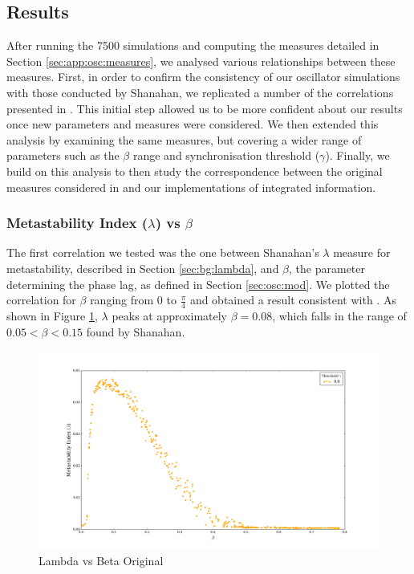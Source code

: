 \documentclass[a4paper,11pt]{article}
\begin{document}
\subsection{Results}

After running the 7500 simulations and computing the measures detailed in Section \ref{sec:app:osc:measures}, we analysed various relationships between these measures. First, in order to confirm the consistency of our oscillator simulations with those conducted by Shanahan, we replicated a number of the correlations presented in \cite{Shanahan2010}. This initial step allowed us to be more confident about our results once new parameters and measures were considered. We then extended this analysis by examining the same measures, but covering a wider range of parameters such as the $\beta$ range and synchronisation threshold ($\gamma$). Finally, we build on this analysis to then study the correspondence between the original measures considered in \cite{Shanahan2010} and our implementations of integrated information.

\subsubsection{Metastability Index ($\lambda$) vs $\beta$}
\label{sec:app:osc:res:meta-v-beta}

The first correlation we tested was the one between Shanahan's $\lambda$ measure for metastability, described in Section \ref{sec:bg:lambda}, and $\beta$, the parameter determining the phase lag, as defined in Section \ref{sec:osc:mod}. We plotted the correlation for $\beta$ ranging from $0$ to $\frac{\pi}{4}$ and obtained a result consistent with \cite{Shanahan2010}. As shown in Figure \ref{fig:lambda-vs-beta-orig}, $\lambda$ peaks at approximately $\beta = 0.08$, which falls in the range of $0.05 < \beta < 0.15$ found by Shanahan.

\begin{figure}[H]
\begin{center}
\includegraphics[scale = 0.35]{figures/lambda_vs_beta_orig}
\end{center}
\caption{
	Lambda vs Beta Original
	\label{fig:lambda-vs-beta-orig}
}
\end{figure}
\end{document}
